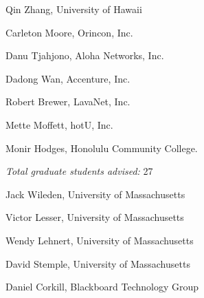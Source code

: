 \documentclass[11pt]{article}
\begin{document}
\begin{Thesis Advisor and Postgraduate-Scholar Sponsor}
\item Qin Zhang, University of Hawaii
\item Carleton Moore, Orincon, Inc.
\item Danu Tjahjono, Aloha Networks, Inc.
\item Dadong Wan, Accenture, Inc.
\item Robert Brewer, LavaNet, Inc.
\item Mette Moffett, hotU, Inc.
\item Monir Hodges, Honolulu Community College.

\item {\em Total graduate students advised:} 27

\end{Thesis Advisor and Postgraduate-Scholar Sponsor}

\begin{Graduate and Postdoctoral Advisors}
\item Jack Wileden, University of Massachusetts
\item Victor Lesser, University of Massachusetts
\item Wendy Lehnert, University of Massachusetts
\item David Stemple, University of Massachusetts
\item Daniel Corkill, Blackboard Technology Group
\end{Graduate and Postdoctoral Advisors}
\end{document}
